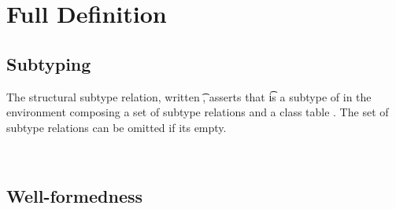 \documentclass[acmlarge, anonymous, authordraft]{acmart}
\begin{document}



\clearpage

\appendix
\section{Full \kafka Definition}%
\label{appendix:kafka}




\subsection{Subtyping}

The structural subtype relation, written \StrSub\M\K\t\tp, asserts that \t
is a subtype of \tp in the environment \M composing a set of subtype relations and
a class table \K.   The set of subtype relations can be omitted if its empty.

~\\

\begin{mathpar}


\end{mathpar}

\begin{mathpar}
\end{mathpar}

\subsection{Well-formedness}
\end{document}
